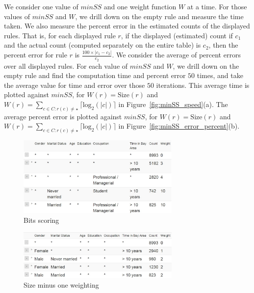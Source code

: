 \documentclass[10pt,journal,compsoc]{IEEEtran}
\begin{document}
We consider one value of $minSS$ and one weight function $W$ at a time. For those values of $minSS$ and $W$, we drill down on the empty rule and measure the time taken. We also measure the percent error in the estimated counts of the displayed rules. That is, for each displayed rule $r$, if the displayed (estimated) count if $c_1$ and the actual count (computed separately on the entire table) is $c_2$, then the percent error for rule $r$ is $\frac{100 \times |c_1-c_2|}{c_2}$. We consider the average of percent errors over all displayed rules. For each value of $minSS$ and $W$, we drill down on the empty rule and find the computation time and percent error $50$ times, and take the average value for time and error over those $50$ iterations. This average time is plotted against $minSS$, for $W(r) = \text{Size}(r)$ and $W(r) = \sum_{c \in C : r(c) \neq \star} \lceil \text{log}_2(|c|) \rceil$ in Figure~\ref{fig:minSS_speed}(a). The average percent error is plotted against $minSS$, for $W(r) = \text{Size}(r)$ and $W(r) = \sum_{c \in C : r(c) \neq \star} \lceil \text{log}_2(|c|) \rceil$ in Figure~\ref{fig:minSS_error_percent}(b). 

\begin{figure}
\centering
\includegraphics[width=80mm,frame]{graphs/screenshots6col/bits_scoring.jpg}
\caption{Bits scoring\label{fig:weigtingbitwise}}
\vspace{-15pt}
\end{figure}

\begin{figure}
\vspace{-10pt}
\centering
\includegraphics[width=80mm,frame]{graphs/screenshots6col/min2_scoring.jpg}
\caption{Size minus one weighting \label{fig:weightingsizeminusone}}
\vspace{-10pt}
\end{figure}
\end{document}
